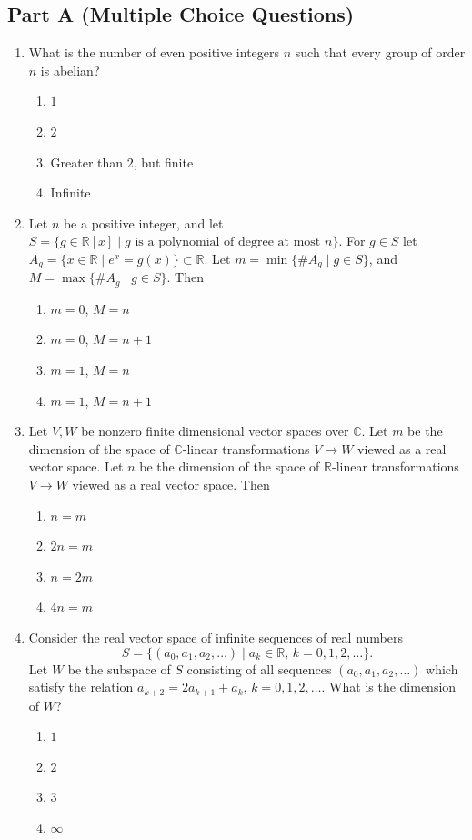 \documentclass[11pt, a4paper]{article}
\begin{document}
\subsection*{Part A (Multiple Choice Questions)}
\begin{enumerate}
  \item What is the number of even positive integers $n$ such that every group of order $n$ is abelian?
  \begin{enumerate}[label=(\alph*)]
    \item $1$
    \item $2$
    \item Greater than $2$, but finite
    \item Infinite
  \end{enumerate}

  \item Let $n$ be a positive integer, and let $S = \{g \in \mathbb{R}[x] \mid g \text{ is a polynomial of degree at most } n\}$. For $g \in S$ let $A_g = \{x \in \mathbb{R} \mid e^x = g(x)\} \subset \mathbb{R}$. Let $m = \min\{\#A_g \mid g \in S\}$, and $M = \max\{\#A_g \mid g \in S\}$. Then
  \begin{enumerate}[label=(\alph*)]
    \item $m = 0$, $M = n$
    \item $m = 0$, $M = n + 1$
    \item $m = 1$, $M = n$
    \item $m = 1$, $M = n + 1$
  \end{enumerate}

  \item Let $V, W$ be nonzero finite dimensional vector spaces over $\mathbb{C}$. Let $m$ be the dimension of the space of $\mathbb{C}$-linear transformations $V \to W$ viewed as a real vector space. Let $n$ be the dimension of the space of $\mathbb{R}$-linear transformations $V \to W$ viewed as a real vector space. Then
  \begin{enumerate}[label=(\alph*)]
    \item $n = m$
    \item $2n = m$
    \item $n = 2m$
    \item $4n = m$
  \end{enumerate}

  \item Consider the real vector space of infinite sequences of real numbers
  \[
    S = \{(a_0, a_1, a_2, \dots) \mid a_k \in \mathbb{R}, \, k = 0, 1, 2, \dots\}.
  \]
  Let $W$ be the subspace of $S$ consisting of all sequences $(a_0, a_1, a_2, \dots)$ which satisfy the relation $a_{k+2} = 2a_{k+1} + a_k$, $k = 0, 1, 2, \dots$. What is the dimension of $W$?
  \begin{enumerate}[label=(\alph*)]
    \item $1$
    \item $2$
    \item $3$
    \item $\infty$
  \end{enumerate}


\end{enumerate}
\end{document}
